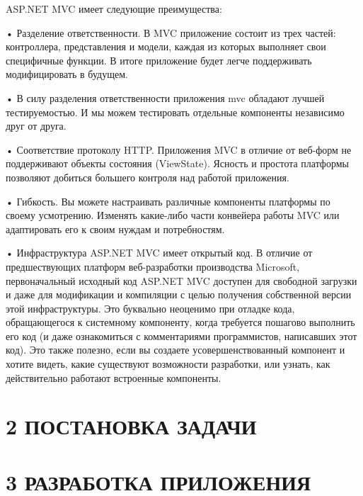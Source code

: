 \documentclass[14pt,a4paper]{extreport}
\begin{document}
	\parindent=1cm ASP.NET MVC имеет следующие преимущества:\par
	• Разделение ответственности. В MVC приложение состоит из трех частей: контроллера, представления и модели, каждая из которых выполняет свои специфичные функции. В итоге приложение будет легче поддерживать модифицировать в будущем.\par
	• В силу разделения ответственности приложения mvc обладают лучшей тестируемостью. И мы можем тестировать отдельные компоненты независимо друг от друга.\par
	• Соответствие протоколу HTTP. Приложения MVC в отличие от веб-форм не поддерживают объекты состояния (ViewState). Ясность и простота платформы позволяют добиться большего контроля над работой приложения.\par
	• Гибкость. Вы можете настраивать различные компоненты платформы по своему усмотрению. Изменять какие-либо части конвейера работы MVC или адаптировать его к своим нуждам и потребностям.\par
	• Инфраструктура ASP.NET MVC имеет открытый код. В отличие от предшествующих платформ веб-разработки производства Microsoft, первоначальный исходный код ASP.NET MVC доступен для свободной загрузки и даже для модификации и компиляции с целью получения собственной версии этой инфраструктуры. Это буквально неоценимо при отладке кода, обращающегося к системному компоненту, когда требуется пошагово выполнить его код (и даже ознакомиться с комментариями программистов, написавших этот код). Это также полезно, если вы создаете усовершенствованный компонент и хотите видеть, какие существуют возможности разработки, или узнать, как действительно работают встроенные компоненты.\par

	\newpage
	\section*{\normalsize\hspace{2ex}2 ПОСТАНОВКА ЗАДАЧИ}

	\newpage
	\section*{\normalsize\hspace{4ex}3 РАЗРАБОТКА ПРИЛОЖЕНИЯ}
\end{document}
